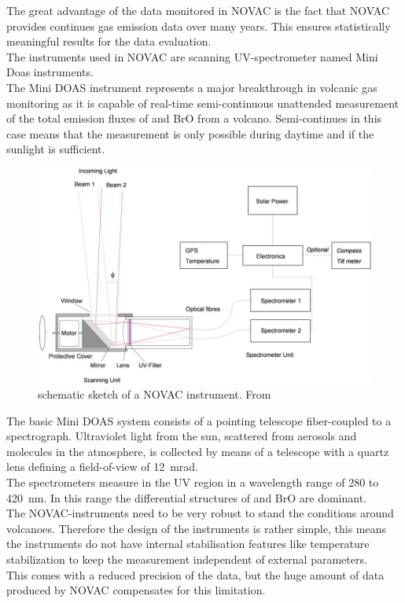 		The great advantage of the data monitored in NOVAC is the fact that NOVAC provides continues gas emission data over many years. This ensures statistically meaningful results for the data evaluation.\\
		The instruments used in NOVAC are scanning UV-spectrometer named Mini Doas instruments. \\
		The  Mini DOAS  instrument  represents  a  major  breakthrough  in  volcanic  gas	monitoring as it is capable of real-time semi-continuous unattended measurement of the total emission fluxes of   and BrO from a volcano. Semi-continues in this case means that the measurement is only possible during daytime and if the sunlight is sufficient.\\
		\begin{figure}
			\centering
		 \includegraphics[width=1\textwidth]{Bilder/Simon/Bilder_Tung/NOVAC_Instrument}
			\caption{schematic sketch of a NOVAC instrument. From \cite{galle2010network}}
		\end{figure}
		The  basic  Mini DOAS  system  consists  of  a  pointing  telescope  fiber-coupled  to  a  spectrograph.  
		Ultraviolet light from the sun, scattered from aerosols and molecules in the atmosphere, is collected by 
		means  of  a  telescope  with  a  quartz  lens  defining  a  field-of-view  of  12~mrad.
		\cite{NOVACsite} \\
		The spectrometers measure in the UV region in a wavelength range of 280 to 420~nm. In this range the differential structures of  and BrO are dominant.\\
		The NOVAC-instruments need to be very robust to stand the conditions around volcanoes. Therefore the design of the instruments is rather simple, this means the instruments do not have internal stabilisation features like temperature stabilization to keep the measurement independent of external parameters.\\
		This comes with a reduced precision of the data, but the huge amount of data produced by NOVAC compensates for this limitation.  
		
